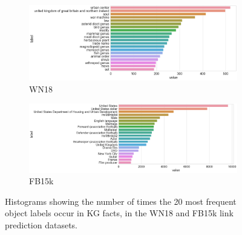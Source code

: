 \begin{figure}[H]
	\begin{subfigure}[b]{.5\linewidth}
   		\centering
    		\includegraphics[width=1.0\linewidth, height=0.7\linewidth]{WN18_Object_Counts}
		\captionsetup{justification=centering}
		\caption{WN18}
	\end{subfigure}
	\begin{subfigure}[b]{.5\linewidth}
   		\centering
		\includegraphics[width=1.0\linewidth, height=0.7\linewidth]{FB15k_Object_Counts}
		\captionsetup{justification=centering}
		\caption{FB15k}
	\end{subfigure}
	\caption{Histograms showing the number of times the 20 most frequent object labels occur in KG facts, in the WN18 and FB15k link prediction datasets.}
\end{figure}


